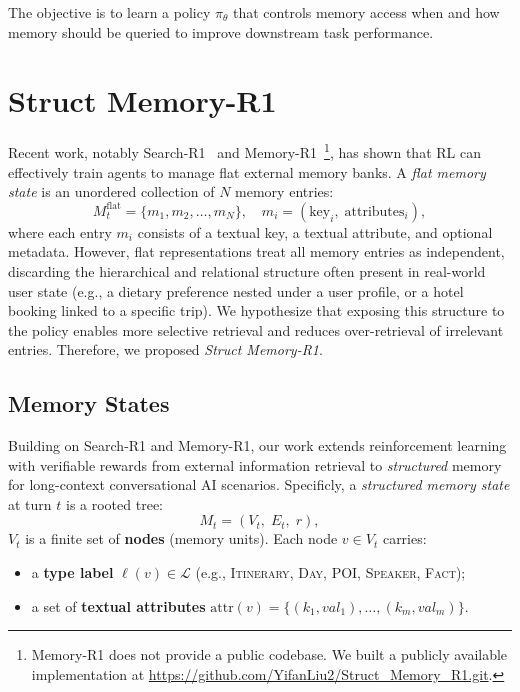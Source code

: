 \documentclass{article}
\theoremstyle{definition}
\begin{document}
The objective is to learn a policy $\pi_\theta$ that controls memory access when and how memory should be queried to improve downstream task performance. 

\section{Struct Memory-R1}

Recent work, notably Search-R1~\citep{jin2025search}  and Memory-R1~\citep{yan2025memory}\footnote{Memory-R1 does not provide a public codebase. We built a publicly available implementation at \url{https://github.com/YifanLiu2/Struct_Memory_R1.git}.}, has shown that RL can effectively train agents to manage flat external memory banks.
A \emph{flat memory state} is an unordered collection of $N$ memory entries:
\[
M_t^{\text{flat}} = \{m_1, m_2, \ldots, m_N\}, \quad m_i = (\text{key}_i,\; \text{attributes}_i),
\]
where each entry $m_i$ consists of a textual key, a textual attribute, and optional metadata.
However, flat representations treat all memory entries as independent, discarding the hierarchical and relational structure often present in real-world user state (e.g., a dietary preference nested under a user profile, or a hotel booking linked to a specific trip). We hypothesize that exposing this structure to the policy enables more selective retrieval and reduces over-retrieval of irrelevant entries. Therefore, we proposed \emph{Struct Memory-R1}. 

\subsection{Memory States}

Building on Search-R1 and Memory-R1, our work extends reinforcement learning with verifiable rewards from external information retrieval to \emph{structured} memory for long-context conversational AI scenarios.
Specificly, a \emph{structured memory state} at turn $t$ is a rooted tree:
\[
M_t = (V_t,\; E_t,\; r),
\]
$V_t$ is a finite set of \textbf{nodes} (memory units). Each node $v \in V_t$ carries:
    \begin{itemize}[nosep]
        \item a \textbf{type label} $\ell(v) \in \mathcal{L}$ (e.g., \textsc{Itinerary}, \textsc{Day}, \textsc{POI}, \textsc{Speaker}, \textsc{Fact});
        \item a set of \textbf{textual attributes} $\text{attr}(v) = \{(k_1, val_1), \ldots, (k_m, val_m)\}$.
    \end{itemize}
\end{document}
